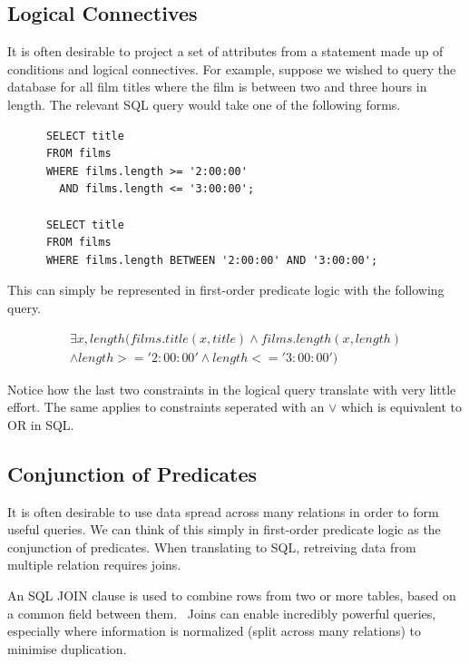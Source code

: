 \documentclass[a4paper, 11pt]{article}
\begin{document}
    \subsection{Logical Connectives}

      It is often desirable to project a set of attributes from a statement
      made up of conditions and logical connectives. For example, suppose we
      wished to query the database for all film titles where the film is between 
      two and three hours in length. The relevant SQL query would take one of
      the following forms.

      \begin{verbatim}
      SELECT title
      FROM films
      WHERE films.length >= '2:00:00'
        AND films.length <= '3:00:00';

      SELECT title
      FROM films
      WHERE films.length BETWEEN '2:00:00' AND '3:00:00';
      \end{verbatim}

      This can simply be represented in first-order predicate logic with the
      following query.

      \begin{gather}
        \exists x, length(films.title(x, title) \land films.length(x,
        length)\\
        \land length >= '2:00:00' \land length <= '3:00:00')
      \end{gather}

      Notice how the last two constraints in the logical query translate
      with very little effort. The same applies to constraints seperated with
      an $\lor$ which is equivalent to OR in SQL.

  \subsection{Conjunction of Predicates}
    \label{sec:joins}

    It is often desirable to use data spread across many relations in order to
    form useful queries. We can think of this simply in first-order predicate
    logic as the conjunction of predicates. When translating to SQL, retreiving
    data from multiple relation requires joins.

    An SQL JOIN clause is used to combine rows from two or more tables, based
    on a common field between them.~\cite{w3JOINS} Joins can enable incredibly
    powerful queries, especially where information
    is normalized (split across many relations) to minimise duplication.
\end{document}
